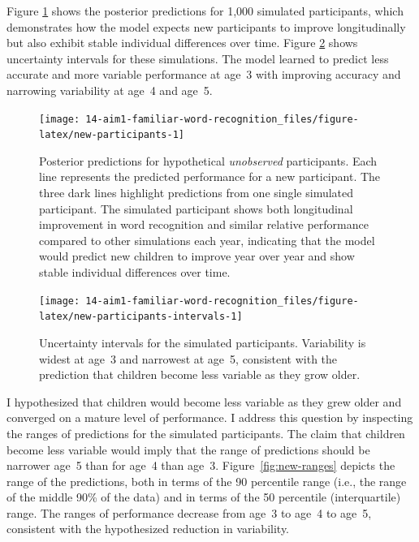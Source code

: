 \documentclass [11pt, proquest] {uwthesis}[2015/03/03]
\begin{document}
Figure \ref{fig:new-participants} shows the posterior predictions for
1,000 simulated participants, which demonstrates how the model expects
new participants to improve longitudinally but also exhibit stable
individual differences over time. Figure
\ref{fig:new-participants-intervals} shows uncertainty intervals for
these simulations. The model learned to predict less accurate and more
variable performance at age~3 with improving accuracy and narrowing
variability at age~4 and age~5.









\begin{figure}
\texttt{[image: 14-aim1-familiar-word-recognition\_files/figure-latex/new-participants-1]} \caption{Posterior predictions for hypothetical
\emph{unobserved} participants. Each line represents the predicted
performance for a new participant. The three dark lines highlight
predictions from one single simulated participant. The simulated
participant shows both longitudinal improvement in word recognition and
similar relative performance compared to other simulations each year,
indicating that the model would predict new children to improve year
over year and show stable individual differences over time.}\label{fig:new-participants}
\end{figure}




\begin{figure}
\texttt{[image: 14-aim1-familiar-word-recognition\_files/figure-latex/new-participants-intervals-1]} \caption{Uncertainty intervals for the simulated
participants. Variability is widest at age~3 and narrowest at age~5,
consistent with the prediction that children become less variable as
they grow older.}\label{fig:new-participants-intervals}
\end{figure}
I hypothesized that children would become less variable as they grew
older and converged on a mature level of performance. I address this
question by inspecting the ranges of predictions for the simulated
participants. The claim that children become less variable would imply
that the range of predictions should be narrower age~5 than for age~4
than age~3. Figure~\ref{fig:new-ranges} depicts the range of the
predictions, both in terms of the 90 percentile range (i.e., the range
of the middle 90\% of the data) and in terms of the 50 percentile
(interquartile) range. The ranges of performance decrease from age~3 to
age~4 to age~5, consistent with the hypothesized reduction in
variability.
\end{document}
